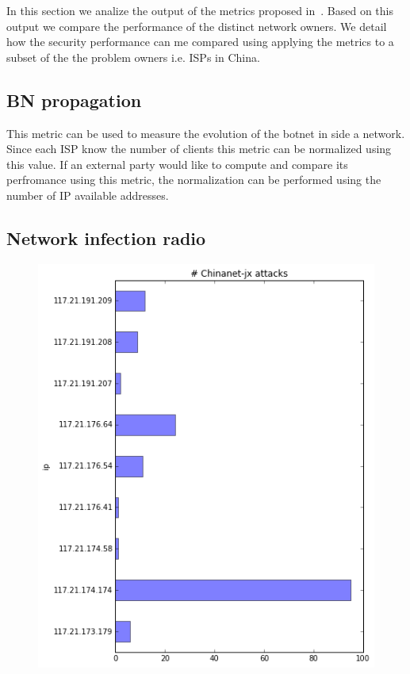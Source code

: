 \label{cap:sec2}
In this section we analize the output of the metrics proposed in~\cite{owr_article}. Based on this output we compare the performance of the distinct network owners. We detail how the security performance can me compared using applying the metrics to a subset of the the problem owners i.e. ISPs in China.

\subsection{BN propagation}
This metric can be used to measure the evolution of the botnet in side a network. Since each ISP know the number of clients this metric can be normalized using this value. If an external party would like to compute and compare its perfromance using this metric, the normalization can be performed using the number of IP available addresses.

\subsection{Network infection radio}


\begin{figure}[h]
    \centering
    \includegraphics[width=\linewidth]{cn-jx}
\end{figure}


